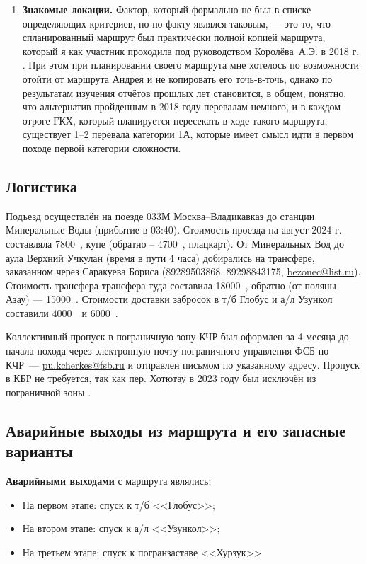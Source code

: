 \begin{enumerate}
	\item\textbf{ Знакомые локации.}
	Фактор, который формально не был в списке определяющих критериев, но по факту являлся таковым, — это то, что спланированный маршрут был практически полной копией маршрута, который я как участник проходила под руководством Королёва~А.Э. в 2018 г. \cite{Korolyov2018}. При этом при планировании своего маршрута мне хотелось по возможности отойти от маршрута Андрея и не копировать его точь-в-точь, однако по результатам изучения отчётов прошлых лет становится, в общем, понятно, что альтернатив пройденным в 2018 году перевалам немного, и в каждом отроге ГКХ, который планируется пересекать в ходе такого маршрута, существует 1–2 перевала категории 1А, которые имеет смысл идти в первом походе первой категории сложности.
\end{enumerate} 

\subsection{Логистика}
Подъезд осуществлён на поезде 033М Москва--Владикавказ до станции Минеральные Воды (прибытие в 03:40). Стоимость проезда на август 2024 г. составляла 7800~\faRub, купе (обратно – 4700~\faRub, плацкарт). От Минеральных Вод до аула Верхний Учкулан (время в пути 4 часа) добирались на трансфере, заказанном через Саракуева Бориса (89289503868, 89298843175,  \href{mailto: bezonec@list.ru}{bezonec@list.ru}). Стоимость трансфера трансфера туда составила 18000~\faRub, обратно (от поляны Азау) — 15000~\faRub. Стоимости доставки забросок в т/б Глобус и а/л Узункол составили 4000~\faRub~и 6000~\faRub.


Коллективный пропуск в пограничную зону КЧР был оформлен за 4 месяца до начала похода через электронную почту пограничного управления ФСБ по КЧР~--- \href{mailto: pu.kcherkes@fsb.ru}{pu.kcherkes@fsb.ru} и отправлен письмом по указанному адресу. Пропуск в КБР не требуется, так как пер. Хотютау в 2023 году был исключён из пограничной зоны \cite{order_kbr}.

\subsection{Аварийные выходы из маршрута и его запасные варианты}
\textbf{Аварийными выходами} с маршрута являлись:
\begin{itemize}
	\item На первом этапе: спуск к т/б <<Глобус>>;
	\item На втором этапе: спуск к а/л <<Узункол>>;
	\item На третьем этапе: спуск к погранзаставе <<Хурзук>>
\end{itemize}


